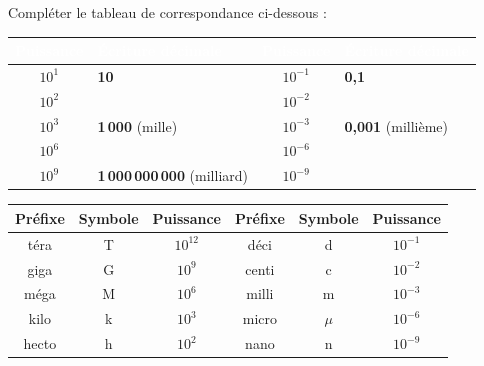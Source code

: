 \begin{cadremethode}
Compléter le tableau de correspondance ci-dessous :
\begin{center}
\renewcommand{\arraystretch}{1.3}
\begin{tabularx}{\linewidth}{|c|X|c|X|}
\hline
\rowcolor{slate800} \textcolor{white}{\textbf{Puissance}} & \textcolor{white}{\textbf{Écriture décimale}} & \textcolor{white}{\textbf{Puissance}} & \textcolor{white}{\textbf{Écriture décimale}} \\
\hline
$10^1$ & \textbf{10} & $10^{-1}$ & \textbf{0,1} \\
\hline
$10^2$ & & $10^{-2}$ & \\
\hline
$10^3$ & \textbf{1\,000} (mille) & $10^{-3}$ & \textbf{0,001} (millième) \\
\hline
$10^6$ & & $10^{-6}$ & \\
\hline
$10^9$ & \textbf{1\,000\,000\,000} (milliard) & $10^{-9}$ & \\
\hline
\end{tabularx}
\end{center}
\end{cadremethode}

\begin{cadreprop}
\begin{center}
\renewcommand{\arraystretch}{1.2}
\small
\begin{tabular}{|c|c|c||c|c|c|}
\hline
\rowcolor{slate200} \textbf{Préfixe} & \textbf{Symbole} & \textbf{Puissance} & \textbf{Préfixe} & \textbf{Symbole} & \textbf{Puissance} \\
\hline
téra & T & $10^{12}$ & déci & d & $10^{-1}$ \\
\hline
giga & G & $10^9$ & centi & c & $10^{-2}$ \\
\hline
méga & M & $10^6$ & milli & m & $10^{-3}$ \\
\hline
kilo & k & $10^3$ & micro & $\mu$ & $10^{-6}$ \\
\hline
hecto & h & $10^2$ & nano & n & $10^{-9}$ \\
\hline
\end{tabular}
\end{center}
\end{cadreprop}

